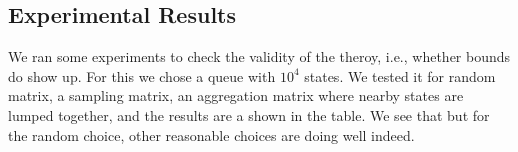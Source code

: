 \documentclass{article}
\begin{document}
\subsection{Experimental Results}
We ran some experiments to check the validity of the theroy, i.e., whether bounds do show up. For this we chose a queue with $10^4$ states.
We tested it for random matrix, a sampling matrix, an aggregation matrix where nearby states are lumped together, and the results are a shown in the table. We see that but for the random choice, other reasonable choices are doing well indeed.
\end{document}
